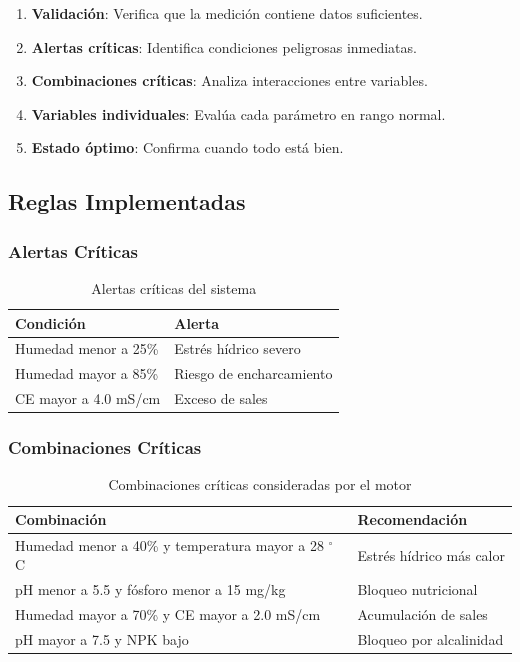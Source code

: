 \documentclass[journal]{IEEEtran}
\begin{document}
\begin{enumerate}
\item \textbf{Validación}: Verifica que la medición contiene datos suficientes.
\item \textbf{Alertas críticas}: Identifica condiciones peligrosas inmediatas.
\item \textbf{Combinaciones críticas}: Analiza interacciones entre variables.
\item \textbf{Variables individuales}: Evalúa cada parámetro en rango normal.
\item \textbf{Estado óptimo}: Confirma cuando todo está bien.
\end{enumerate}

\subsection{Reglas Implementadas}

\subsubsection{Alertas Críticas}

\begin{table}[h]
\centering
\caption{Alertas críticas del sistema}
\label{tab:alertas}
\scriptsize
\begin{tabularx}{\columnwidth}{|>{\raggedright\arraybackslash}X|
                                  >{\raggedright\arraybackslash}X|}
\hline
\textbf{Condición} & \textbf{Alerta} \\
\hline
Humedad menor a 25\% & Estrés hídrico severo \\
\hline
Humedad mayor a 85\% & Riesgo de encharcamiento \\
\hline
CE mayor a 4.0 mS/cm & Exceso de sales \\
\hline
\end{tabularx}
\end{table}

\subsubsection{Combinaciones Críticas}

\begin{table}[h]
\centering
\caption{Combinaciones críticas consideradas por el motor}
\label{tab:combinaciones}
\scriptsize
\begin{tabularx}{\columnwidth}{|>{\raggedright\arraybackslash}X|
                                  >{\raggedright\arraybackslash}X|}
\hline
\textbf{Combinación} & \textbf{Recomendación} \\
\hline
Humedad menor a 40\% y temperatura mayor a 28 $^\circ$C & Estrés hídrico más calor \\
\hline
pH menor a 5.5 y fósforo menor a 15 mg/kg & Bloqueo nutricional \\
\hline
Humedad mayor a 70\% y CE mayor a 2.0 mS/cm & Acumulación de sales \\
\hline
pH mayor a 7.5 y NPK bajo & Bloqueo por alcalinidad \\
\hline
\end{tabularx}
\end{table}
\end{document}
